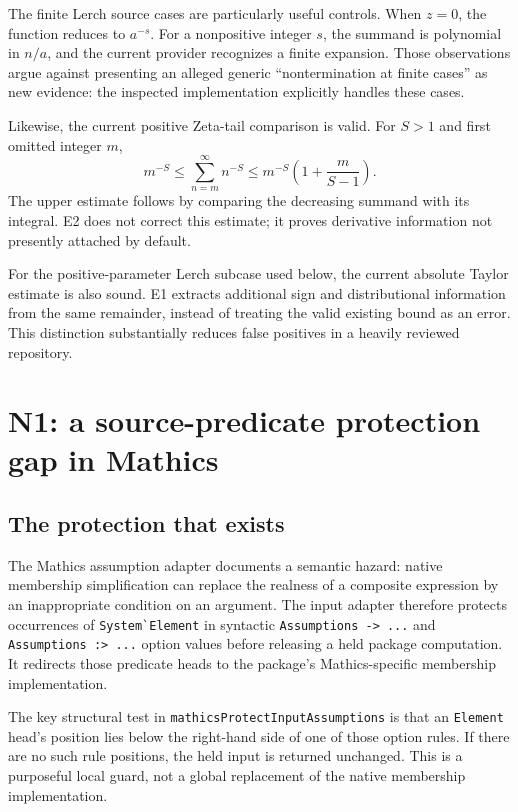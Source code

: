 \documentclass[11pt,a4paper]{article}
\newcommand{\code}[1]{\nolinkurl{#1}}
\begin{document}
The finite Lerch source cases are particularly useful controls. When $z=0$, the function reduces to $a^{-s}$. For a nonpositive integer $s$, the summand is polynomial in $n/a$, and the current provider recognizes a finite expansion. Those observations argue against presenting an alleged generic ``nontermination at finite cases'' as new evidence: the inspected implementation explicitly handles these cases.\cite{dirichlet}

Likewise, the current positive Zeta-tail comparison is valid. For $S>1$ and first omitted integer $m$,
\begin{equation}\label{eq:zeta-current}
 m^{-S}\leq \sum_{n=m}^{\infty}n^{-S}
 \leq m^{-S}\left(1+\frac{m}{S-1}\right).
\end{equation}
The upper estimate follows by comparing the decreasing summand with its integral. E2 does not correct this estimate; it proves derivative information not presently attached by default.

For the positive-parameter Lerch subcase used below, the current absolute Taylor estimate is also sound. E1 extracts additional sign and distributional information from the same remainder, instead of treating the valid existing bound as an error. This distinction substantially reduces false positives in a heavily reviewed repository.

\section{N1: a source-predicate protection gap in Mathics}\label{sec:boundary}

\subsection{The protection that exists}
The Mathics assumption adapter documents a semantic hazard: native membership simplification can replace the realness of a composite expression by an inappropriate condition on an argument. The input adapter therefore protects occurrences of \code{System`Element} in syntactic \code{Assumptions -> ...} and \code{Assumptions :> ...} option values before releasing a held package computation. It redirects those predicate heads to the package's Mathics-specific membership implementation.\cite{mathicsassumptions,mathicsinput}

The key structural test in \code{mathicsProtectInputAssumptions} is that an \code{Element} head's position lies below the right-hand side of one of those option rules. If there are no such rule positions, the held input is returned unchanged. This is a purposeful local guard, not a global replacement of the native membership implementation.
\end{document}
